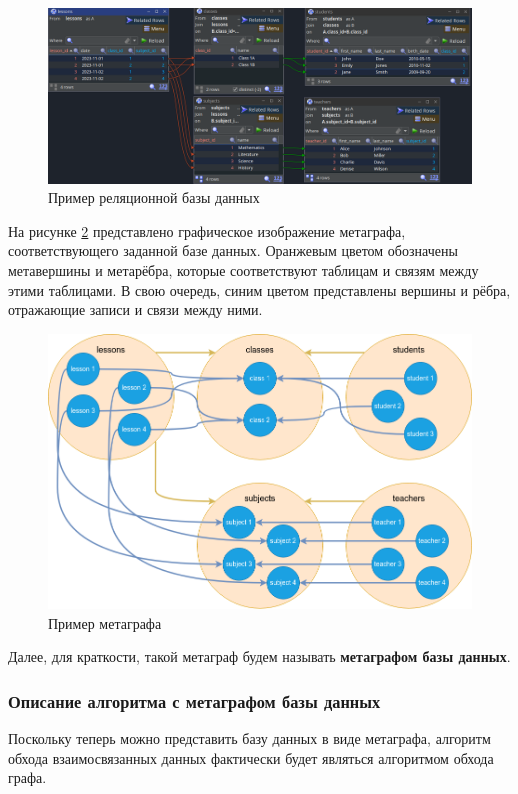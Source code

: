 \begin{figure}
  \includegraphics[scale=0.45]{./img/jailer-example-db-overview.png}
  \caption{Пример реляционной базы данных}
  \label{db-example}
\end{figure}

На рисунке \ref{metagraph-example} представлено графическое изображение метаграфа, соответствующего заданной базе данных. Оранжевым цветом обозначены метавершины и метарёбра, которые соответствуют таблицам и связям между этими таблицами. В свою очередь, синим цветом представлены вершины и рёбра, отражающие записи и связи между ними.

\begin{figure}
  \includegraphics[scale=0.5]{./img/drawio-metagraph-overview.png}
  \caption{Пример метаграфа}
  \label{metagraph-example}
\end{figure}

Далее, для краткости, такой метаграф будем называть \textbf{метаграфом базы данных}.

\subsubsection{Описание алгоритма с метаграфом базы данных}
Поскольку теперь можно представить базу данных в виде метаграфа, алгоритм обхода взаимосвязанных данных фактически будет являться алгоритмом обхода графа.

